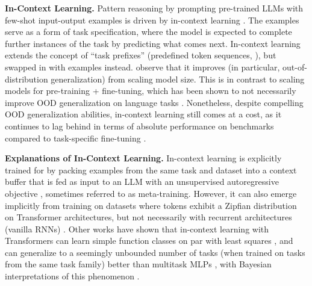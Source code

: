 \textbf{In-Context Learning.} Pattern reasoning by prompting pre-trained LLMs with few-shot input-output examples is driven by in-context learning \cite{radford2019language,brown2020language}. The examples serve as a form of task specification, where the model is expected to complete further instances of the task by predicting what comes next. In-context learning extends the concept of ``task prefixes'' (predefined token sequences, \eg \cite{raffel2020exploring}), but swapped in with examples instead. \citet{brown2020language} observe that it improves (in particular, out-of-distribution generalization) from scaling model size. This is in contrast to scaling models for pre-training + fine-tuning, which has been shown to not necessarily improve OOD generalization on language tasks \cite{hendrycks2020pretrained}. Nonetheless, despite compelling OOD generalization abilities, in-context learning still comes at a cost, as it continues to lag behind in terms of absolute performance on benchmarks compared to task-specific fine-tuning \cite{radford2019language, dinh2022lift}.

\textbf{Explanations of In-Context Learning.} In-context learning is explicitly trained for by packing examples from the same task and dataset into a context buffer that is fed as input to an LLM with an unsupervised autoregressive objective \cite{brown2020language}, sometimes referred to as meta-training. However, it can also emerge implicitly from training on datasets where tokens exhibit a Zipfian distribution \cite{chan2022data} on Transformer architectures, but not necessarily with recurrent architectures (\eg vanilla RNNs) \cite{chan2022data}. Other works have shown that in-context learning with Transformers can learn simple function classes on par with least squares \cite{garg2022can,akyurek2022learning,von2023transformers}, and can generalize to a seemingly unbounded number of tasks (when trained on tasks from the same task family) better than multitask MLPs \cite{kirsch2022general}, with Bayesian interpretations of this phenomenon \cite{xie2021explanation} \cite{wang2023large}.


